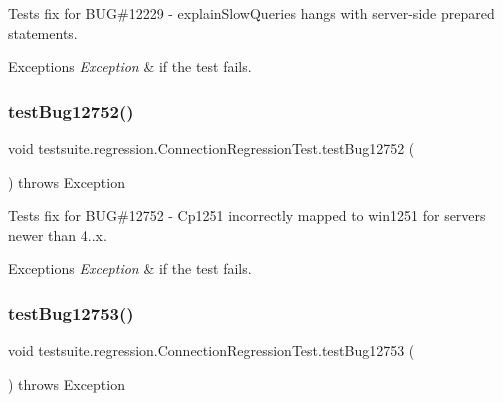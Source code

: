Tests fix for B\+UG\#12229 -\/ explain\+Slow\+Queries hangs with server-\/side prepared statements.


\begin{DoxyExceptions}{Exceptions}
{\em Exception} & if the test fails. \\
\hline
\end{DoxyExceptions}
\mbox{\label{classtestsuite_1_1regression_1_1_connection_regression_test_a835b955e0018a43040f38a7dff684e0c}} 
\subsubsection{\texorpdfstring{test\+Bug12752()}{testBug12752()}}
{\footnotesize\ttfamily void testsuite.\+regression.\+Connection\+Regression\+Test.\+test\+Bug12752 (\begin{DoxyParamCaption}{ }\end{DoxyParamCaption}) throws Exception}

Tests fix for B\+UG\#12752 -\/ Cp1251 incorrectly mapped to win1251 for servers newer than 4..\+x.


\begin{DoxyExceptions}{Exceptions}
{\em Exception} & if the test fails. \\
\hline
\end{DoxyExceptions}
\mbox{\label{classtestsuite_1_1regression_1_1_connection_regression_test_a16ab33fe936fd5b6fd19d3c284df8f59}} 
\subsubsection{\texorpdfstring{test\+Bug12753()}{testBug12753()}}
{\footnotesize\ttfamily void testsuite.\+regression.\+Connection\+Regression\+Test.\+test\+Bug12753 (\begin{DoxyParamCaption}{ }\end{DoxyParamCaption}) throws Exception}

